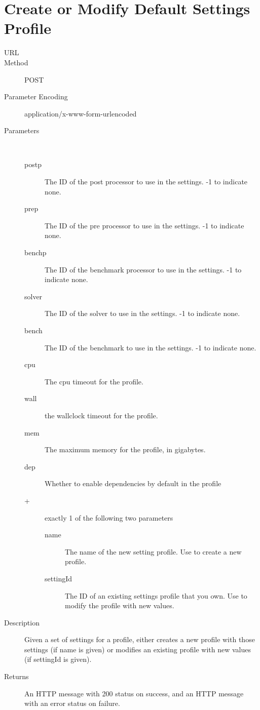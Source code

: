 \section{Create or Modify Default Settings Profile}
\begin{description}
\item [URL] 
\item [Method] POST
\item [Parameter Encoding] application/x-www-form-urlencoded
\item [Parameters] \
	\begin{description}
	\item [postp]  The ID of the post processor to use in the settings. -1 to indicate none.
	\item [prep]  The ID of the pre processor to use in the settings. -1 to indicate none.
	\item [benchp]  The ID of the benchmark processor to use in the settings. -1 to indicate none.
	\item [solver]  The ID of the solver to use in the settings. -1 to indicate none.
	\item [bench]  The ID of the benchmark to use in the settings. -1 to indicate none.
	\item [cpu]  The cpu timeout for the profile.
	\item [wall] \type{Integer} the wallclock timeout for the profile.
	\item [mem] \type{Float} The maximum memory for the profile, in gigabytes.
	\item [dep] \type{Boolean} Whether to enable dependencies by default in the profile
	\item [+] exactly 1 of the following two parameters
		\begin{description}
		\item [name]  The name of the new setting profile. Use to create a new profile.
		\item [settingId] \type{Integer} The ID of an existing settings profile that you own. Use to modify the profile with new values.
		\end{description}
	\end{description}
\item [Description] Given a set of settings for a profile, either creates a new profile with those settings (if name is given) or modifies an existing profile with new values (if settingId is given).
\item [Returns] An HTTP message with 200 status on success, and an HTTP message with an error status on failure.
\end{description}


